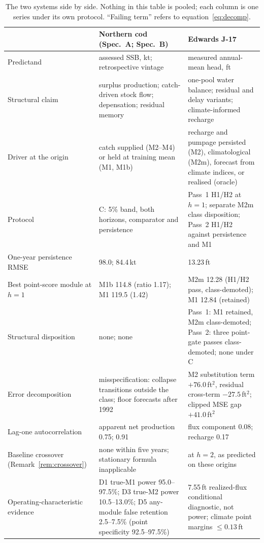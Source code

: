 \documentclass[preprint,11pt,authoryear]{elsarticle}
\theoremstyle{definition}
\theoremstyle{remark}
\begin{document}
\begin{table}[!htb]
\centering\small
\caption{The two systems side by side. Nothing in this table is pooled; each column is one series under its own protocol. ``Failing term'' refers to equation~\eqref{eq:decomp}.}
\label{tab:cross}
\begin{tabularx}{\textwidth}{@{}>{\raggedright\arraybackslash}p{}LL@{}}
\toprule
 & Northern cod (Spec.\ A; Spec.\ B) & Edwards J-17 \\
\midrule
Predictand & assessed SSB, kt; retrospective vintage & measured annual-mean head, ft \\
Structural claim & surplus production; catch-driven stock flow; depensation; residual memory & one-pool water balance; residual and delay variants; climate-informed recharge \\
Driver at the origin & catch supplied (M2--M4) or held at training mean (M1, M1b) & recharge and pumpage persisted (M2), climatological (M2m), forecast from climate indices, or realised (oracle) \\
Protocol & C: 5\% band, both horizons, comparator and persistence & Pass~1 H1/H2 at $h=1$; separate M2m class disposition; Pass~2 H1/H2 against persistence and M1 \\
One-year persistence RMSE & 98.0; 84.4\,kt & 13.23\,ft \\
Best point-score module at $h=1$ & M1b 114.8 (ratio 1.17); M1 119.5 (1.42) & M2m 12.28 (H1/H2 pass, class-demoted); M1 12.84 (retained) \\
Structural disposition & none; none & Pass~1: M1 retained, M2m class-demoted; Pass~2: three point-gate passes class-demoted; none under C \\
Error decomposition & misspecification: collapse transitions outside the class; floor forecasts after 1992 & M2 substitution term $+76.0$\,ft$^2$, residual cross-term $-27.5$\,ft$^2$; clipped MSE gap $+41.0$\,ft$^2$ \\
Lag-one autocorrelation & apparent net production 0.75; 0.91 & flux component 0.08; recharge 0.17 \\
Baseline crossover (Remark~\ref{rem:crossover}) & none within five years; stationary formula inapplicable & at $h=2$, as predicted on these origins \\
Operating-characteristic evidence & D1 true-M1 power 95.0--97.5\%; D3 true-M2 power 10.5--13.0\%; D5 any-module false retention 2.5--7.5\% (point specificity 92.5--97.5\%) & 7.55\,ft realized-flux conditional diagnostic, not power; climate point margins $\le0.13$\,ft \\
\bottomrule
\end{tabularx}
\end{table}
\FloatBarrier
\end{document}

